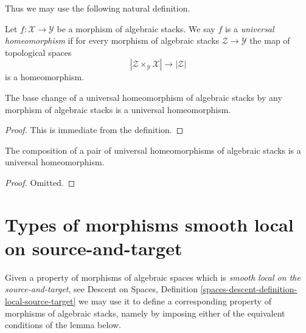 \noindent
Thus we may use the following natural definition.

\begin{definition}
\label{definition-universal-homeomorphism}
Let $f : \mathcal{X} \to \mathcal{Y}$ be a morphism of algebraic stacks.
We say $f$ is a {\it universal homeomorphism} if for every morphism
of algebraic stacks $\mathcal{Z} \to \mathcal{Y}$
the map of topological spaces
$$
|\mathcal{Z} \times_\mathcal{Y} \mathcal{X}| \to |\mathcal{Z}|
$$
is a homeomorphism.
\end{definition}

\begin{lemma}
\label{lemma-base-change-universal-homeomorphism}
The base change of a universal homeomorphism of algebraic stacks
by any morphism of algebraic stacks is a universal homeomorphism.
\end{lemma}

\begin{proof}
This is immediate from the definition.
\end{proof}

\begin{lemma}
\label{lemma-composition-universal-homeomorphism}
The composition of a pair of universal homeomorphisms of
algebraic stacks is a universal homeomorphism.
\end{lemma}

\begin{proof}
Omitted.
\end{proof}










\section{Types of morphisms smooth local on source-and-target}
\label{section-local-source-target}

\noindent
Given a property of morphisms of algebraic spaces which is
{\it smooth local on the source-and-target}, see
Descent on Spaces,
Definition \ref{spaces-descent-definition-local-source-target}
we may use it to define a corresponding
property of morphisms of algebraic stacks, namely by imposing either of
the equivalent conditions of the lemma below.

